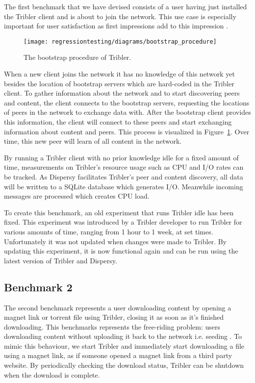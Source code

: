 The first benchmark that we have devised consists of a user having just installed the Tribler client and is about to join the network.
This use case is especially important for user satisfaction as first impressions add to this impression \cite{ferre2001usability}.

\begin{figure}[!h]
	\centering
	\texttt{[image: regressiontesting/diagrams/bootstrap\_procedure]}
	\caption{The bootstrap procedure of Tribler.}
	\label{fig:tribler_bootstrapping}
\end{figure}

When a new client joins the network it has no knowledge of this network yet besides the location of bootstrap servers which are hard-coded in the Tribler client.
To gather information about the network and to start discovering peers and content, the client connects to the bootstrap servers, requesting the locations of peers in the network to exchange data with.
After the bootstrap client provides this information, the client will connect to these peers and start exchanging information about content and peers.
This process is visualized in Figure~\ref{fig:tribler_bootstrapping}.
Over time, this new peer will learn of all content in the network.

By running a Tribler client with no prior knowledge idle for a fixed amount of time, measurements on Tribler's resource usage such as CPU and I/O rates can be tracked.
As Dispersy facilitates Tribler's peer and content discovery, all data will be written to a SQLite database which generates I/O.
Meanwhile incoming messages are processed which creates CPU load.

To create this benchmark, an old experiment that runs Tribler idle has been fixed.
This experiment was introduced by a Tribler developer to run Tribler for various amounts of time, ranging from 1 hour to 1 week, at set times.
Unfortunately it was not updated when changes were made to Tribler.
By updating this experiment, it is now functional again and can be run using the latest version of Tribler and Dispersy.

\subsection{Benchmark 2}

The second benchmark represents a user downloading content by opening a magnet link or torrent file using Tribler, closing it as soon as it's finished downloading.
This benchmarks represents the free-riding problem: users downloading content without uploading it back to the network i.e. seeding \cite{adar2000free}.
To mimic this behaviour, we start Tribler and immediately start downloading a file using a magnet link, as if someone opened a magnet link from a third party website.
By periodically checking the download status, Tribler can be shutdown when the download is complete.

